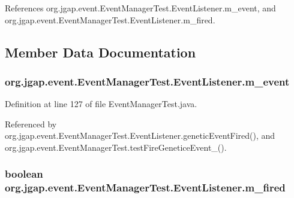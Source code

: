 References org.\-jgap.\-event.\-Event\-Manager\-Test.\-Event\-Listener.\-m\-\_\-event, and org.\-jgap.\-event.\-Event\-Manager\-Test.\-Event\-Listener.\-m\-\_\-fired.



\subsection{Member Data Documentation}
\hypertarget{classorg_1_1jgap_1_1event_1_1_event_manager_test_1_1_event_listener_aabba2d6e914197bff4a6cc283f78bcd8}{
\subsubsection[{m\-\_\-event}]{ org.\-jgap.\-event.\-Event\-Manager\-Test.\-Event\-Listener.\-m\-\_\-event\hspace{0.3cm}{\ttfamily [private]}}}\label{classorg_1_1jgap_1_1event_1_1_event_manager_test_1_1_event_listener_aabba2d6e914197bff4a6cc283f78bcd8}


Definition at line 127 of file Event\-Manager\-Test.\-java.



Referenced by org.\-jgap.\-event.\-Event\-Manager\-Test.\-Event\-Listener.\-genetic\-Event\-Fired(), and org.\-jgap.\-event.\-Event\-Manager\-Test.\-test\-Fire\-Genetice\-Event\-\_().

\hypertarget{classorg_1_1jgap_1_1event_1_1_event_manager_test_1_1_event_listener_aa9d30d6fa9ef86081940b9733f8b10e5}{
\subsubsection[{m\-\_\-fired}]{\setlength{\rightskip}{0pt plus 5cm}boolean org.\-jgap.\-event.\-Event\-Manager\-Test.\-Event\-Listener.\-m\-\_\-fired\hspace{0.3cm}{\ttfamily [private]}}}\label{classorg_1_1jgap_1_1event_1_1_event_manager_test_1_1_event_listener_aa9d30d6fa9ef86081940b9733f8b10e5}


